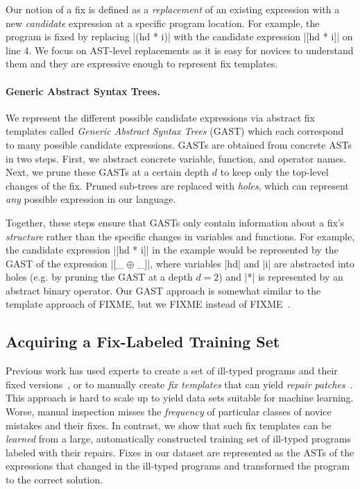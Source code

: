 Our notion of a fix is defined as a \emph{replacement} of an existing expression
with a new \emph{candidate} expression at a specific program location. For
example, the \mbd program is fixed by replacing |(hd * i)| with the candidate
expression |[hd * i]| on line 4. We focus on AST-level replacements as it is
easy for novices to understand them and they are expressive enough to represent fix
templates. 


\paragraph{Generic Abstract Syntax Trees.}
%
We represent the different possible candidate expressions via abstract fix
templates called \emph{Generic Abstract Syntax Trees} (GAST) which each correspond to
many possible candidate expressions.
%
GASTs are obtained from concrete ASTs in two steps.
%
First, we abstract concrete variable, function, and operator names.
%
Next, we prune these GASTs at a certain depth $d$ to keep only the top-level
changes of the fix. Pruned sub-trees are replaced with \emph{holes}, which can
represent \emph{any} possible expression in our language.


Together, these steps ensure that GASTs only contain information about a fix's
\emph{structure} rather than the specific changes in variables and functions.
%
For example, the candidate expression |[hd * i]| in the \mbd example would be
represented by the GAST of the expression |[_ $\oplus$ _]|, where variables |hd|
and |i| are abstracted into holes (e.g. by pruning the GAST at a depth $d=2$)
and |*| is represented by an abstract binary operator. Our GAST approach
is somewhat similar to the template approach of FIXME, but we FIXME instead
of FIXME~\cite{FIXME}.


\subsection{Acquiring a Fix-Labeled Training Set}
\label{sec:overview:data}

Previous work has used experts to create a set of ill-typed programs and their
fixed versions~\citep[][]{Lerner2007-dt, Loncaric2016-uk}, or to manually create
\emph{fix templates} that can yield \emph{repair
patches}~\citep[][]{martinez2013automatically,martinez2015mining}.
%
This approach is hard to scale up to yield data sets suitable for machine
learning. Worse, manual inspection misses the \emph{frequency} of particular
classes of novice mistakes and their fixes. 
%
In contrast, we show that such fix templates can be \emph{learned} from a large,
automatically constructed training set of ill-typed programs labeled with their
repairs.
%
Fixes in our dataset are represented as the ASTs of the expressions that changed
in the ill-typed programs and transformed the program to the correct solution.

